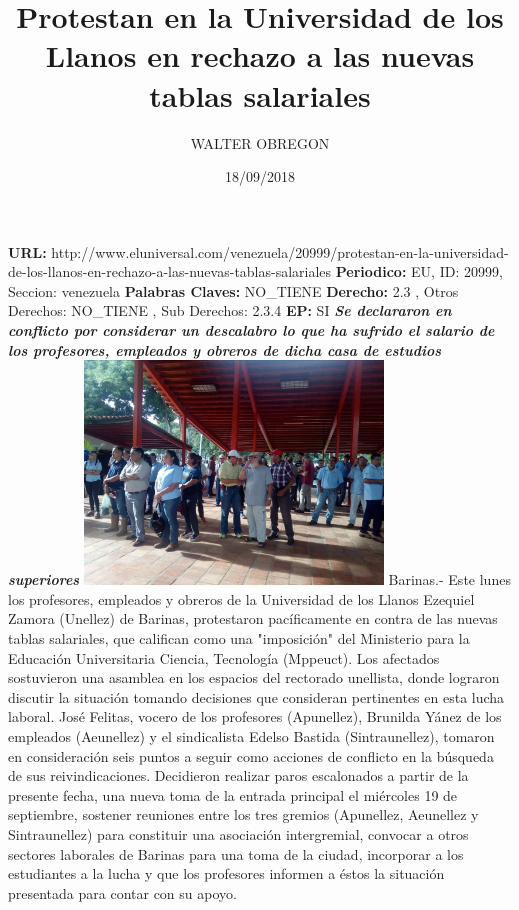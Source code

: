 \documentclass{article}%
\title{\textbf{Protestan en la Universidad de los Llanos en rechazo a las nuevas tablas salariales}}%
\author{WALTER OBREGON}%
\date{18/09/2018}%
\begin{document}
%
\normalsize%
\maketitle%
\textbf{URL: }%
http://www.eluniversal.com/venezuela/20999/protestan{-}en{-}la{-}universidad{-}de{-}los{-}llanos{-}en{-}rechazo{-}a{-}las{-}nuevas{-}tablas{-}salariales\newline%
%
\textbf{Periodico: }%
EU, %
ID: %
20999, %
Seccion: %
venezuela\newline%
%
\textbf{Palabras Claves: }%
NO\_TIENE\newline%
%
\textbf{Derecho: }%
2.3%
, Otros Derechos: %
NO\_TIENE%
, Sub Derechos: %
2.3.4%
\newline%
%
\textbf{EP: }%
SI\newline%
\newline%
%
\textbf{\textit{Se declararon en conflicto por considerar un descalabro lo que ha sufrido el salario de los profesores, empleados y obreros de dicha casa de estudios superiores}}%
\newline%
\newline%
%
\includegraphics[width=300px]{171.jpg}%
\newline%
%
Barinas.{-} Este lunes los profesores, empleados y obreros de la Universidad de los Llanos Ezequiel Zamora (Unellez) de Barinas, protestaron pacíficamente en contra de las nuevas tablas salariales, que califican como una "imposición" del Ministerio para la Educación Universitaria Ciencia, Tecnología (Mppeuct).%
\newline%
%
Los afectados sostuvieron una asamblea en los espacios del rectorado unellista, donde lograron discutir la situación tomando decisiones que consideran pertinentes en esta lucha laboral.%
\newline%
%
José Felitas, vocero de los profesores (Apunellez), Brunilda Yánez de los empleados (Aeunellez) y el sindicalista Edelso Bastida (Sintraunellez), tomaron en consideración seis puntos a seguir como acciones de conflicto en la búsqueda de sus reivindicaciones.%
\newline%
%
Decidieron realizar paros escalonados a partir de la presente fecha, una nueva toma de la entrada principal el miércoles 19 de septiembre, sostener reuniones entre los tres gremios (Apunellez, Aeunellez y Sintraunellez) para constituir una asociación intergremial, convocar a otros sectores laborales de Barinas para una toma de la ciudad, incorporar a los estudiantes a la lucha y que los profesores informen a éstos la situación presentada para contar con su apoyo.%
\newline%
%
\end{document}
